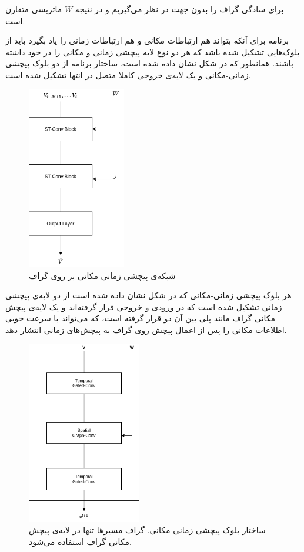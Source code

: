 \documentclass{article}
\begin{document}
برای سادگی گراف را بدون جهت در نظر می‌گیریم و در نتیجه $W$ ماتریسی متقارن است.

برنامه برای آنکه بتواند هم ارتباطات مکانی و هم ارتباطات زمانی را یاد بگیرد باید از بلوک‌هایی تشکیل شده باشد که هر دو نوع لایه پیچشی زمانی و مکانی را در خود داشته باشند.
همانطور که در شکل  نشان داده شده است، ساختار برنامه از دو بلوک پیچشی زمانی-مکانی و یک لایه‌ی خروجی کاملا متصل در انتها تشکیل شده است.

\begin{figure}
  \includegraphics[height=8cm]{./images/blocks.png}
  \centering
  \caption{
شبکه‌ی پیچشی زمانی-مکانی بر روی گراف 
  }
  \label{fig:blocks}
\end{figure}

هر بلوک پیچشی زمانی-مکانی که در شکل  نشان داده شده است از دو لایه‌ی پیچشی زمانی تشکیل شده است که در ورودی و خروجی قرار گرفته‌اند
و یک لایه‌ی پیچش مکانی گراف مانند پلی بین آن دو قرار گرفته است، که می‌تواند با سرعت خوبی اطلاعات مکانی را پس از اعمال پیچش روی گراف
به پیچش‌های زمانی انتشار دهد.

\begin{figure}
  \includegraphics[height=8cm]{./images/inner-blocks.png}
  \centering
  \caption{
ساختار بلوک پیچشی زمانی-مکانی. گراف مسیرها تنها در لایه‌ی پیچش مکانی گراف استفاده می‌شود. 
  }
  \label{fig:inner-blocks}
\end{figure}
\end{document}
